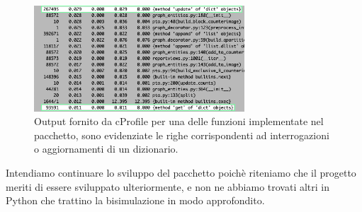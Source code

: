 \begin{figure}
    \centering
    \includegraphics[width=0.7\textwidth]{./sezione3/future/resources/profiler.png}
    \caption{Output fornito da cProfile per una delle funzioni implementate nel pacchetto, sono evidenziate le righe corrispondenti ad interrogazioni o aggiornamenti di un dizionario.}
    \label{fig:cprofile_result}
\end{figure}

Intendiamo continuare lo sviluppo del pacchetto poichè riteniamo che il progetto meriti di essere sviluppato ulteriormente, e non ne abbiamo trovati altri in Python che trattino la bisimulazione in modo approfondito.
